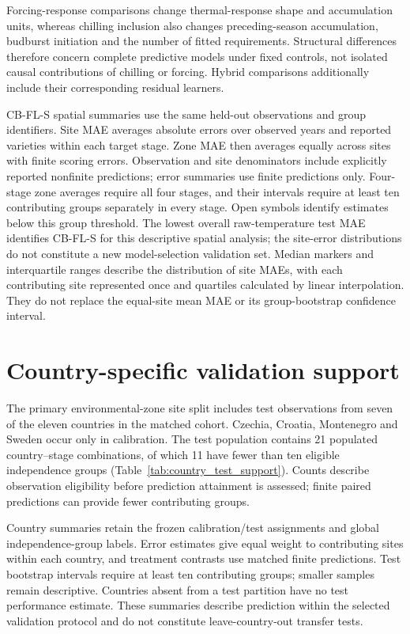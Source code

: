\documentclass[a4paper,11pt]{article}
\let\OriginalSection\section
\renewcommand{\section}{\FloatBarrier\OriginalSection}
\begin{document}
Forcing-response comparisons change thermal-response shape and accumulation units, whereas chilling inclusion also changes preceding-season accumulation, budburst initiation and the number of fitted requirements. Structural differences therefore concern complete predictive models under fixed controls, not isolated causal contributions of chilling or forcing. Hybrid comparisons additionally include their corresponding residual learners.

CB-FL-S spatial summaries use the same held-out observations and group identifiers. Site MAE averages absolute errors over observed years and reported varieties within each target stage. Zone MAE then averages equally across sites with finite scoring errors. Observation and site denominators include explicitly reported nonfinite predictions; error summaries use finite predictions only. Four-stage zone averages require all four stages, and their intervals require at least ten contributing groups separately in every stage. Open symbols identify estimates below this group threshold. The lowest overall raw-temperature test MAE identifies CB-FL-S for this descriptive spatial analysis; the site-error distributions do not constitute a new model-selection validation set. Median markers and interquartile ranges describe the distribution of site MAEs, with each contributing site represented once and quartiles calculated by linear interpolation. They do not replace the equal-site mean MAE or its group-bootstrap confidence interval.

\section{Country-specific validation support}

The primary environmental-zone site split includes test observations from seven
of the eleven countries in the matched cohort. Czechia, Croatia, Montenegro
and Sweden occur only in calibration. The test population contains 21 populated
country--stage combinations, of which 11 have fewer than ten eligible
independence groups (Table~\ref{tab:country_test_support}). Counts describe
observation eligibility before prediction attainment is assessed; finite paired
predictions can provide fewer contributing groups.

Country summaries retain the frozen calibration/test assignments and global
independence-group labels. Error estimates give equal weight to contributing
sites within each country, and treatment contrasts use matched finite
predictions. Test bootstrap intervals require at least ten contributing groups;
smaller samples remain descriptive. Countries absent from a test partition
have no test performance estimate. These summaries describe prediction within
the selected validation protocol and do not constitute leave-country-out
transfer tests.
\end{document}
